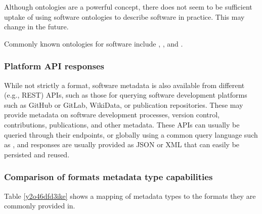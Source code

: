 \documentclass{article}
\begin{document}
Although ontologies are a powerful concept, there does not seem to be sufficient uptake of using software ontologies to describe software in practice. This may change in the future.

Commonly known ontologies for software include \cite{11045035/TVVPYY5L}, \cite{11045035/5JK345NF}, \cite{11045035/A8V7DJ4R} and \cite{11045035/YPMVLAM4}.



\subsubsection{Platform API responses}\label{lywgz4ko95mj}
While not strictly a format, software metadata is also available from different (e.g., REST) APIs, such as those for querying software development platforms such as GitHub or GitLab, WikiData, or publication repositories. These may provide metadata on software development processes, version control, contributions, publications, and other metadata. These APIs can usually be queried through their endpoints, or globally using a common query language such as \cite{138880/D5YC8HI5}, and responses are usually provided as JSON or XML that can easily be persisted and reused.



\subsubsection{Comparison of formats metadata type capabilities}\label{ic5kiajfpf04}
Table \ref{y2o46dfd3ike} shows a mapping of metadata types to the formats they are commonly provided in.
\end{document}
